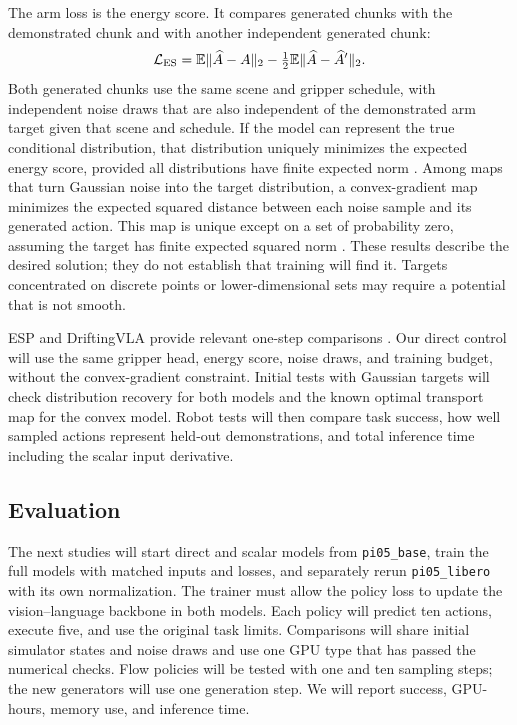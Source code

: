 The arm loss is the energy score. It compares generated chunks with the demonstrated chunk and with another independent generated chunk:
\begin{equation}
\mathcal L_{\rm ES}=\mathbb E\lVert\widehat A-A\rVert_2
-\tfrac12\mathbb E\lVert\widehat A-\widehat A'\rVert_2.
\end{equation}
Both generated chunks use the same scene and gripper schedule, with independent noise draws that are also independent of the demonstrated arm target given that scene and schedule. If the model can represent the true conditional distribution, that distribution uniquely minimizes the expected energy score, provided all distributions have finite expected norm \cite{gneitingraftery2007}. Among maps that turn Gaussian noise into the target distribution, a convex-gradient map minimizes the expected squared distance between each noise sample and its generated action. This map is unique except on a set of probability zero, assuming the target has finite expected squared norm \cite{brenier1991,mccann1995}. These results describe the desired solution; they do not establish that training will find it. Targets concentrated on discrete points or lower-dimensional sets may require a potential that is not smooth.

ESP and DriftingVLA provide relevant one-step comparisons \cite{esp,driftingvla}. Our direct control will use the same gripper head, energy score, noise draws, and training budget, without the convex-gradient constraint. Initial tests with Gaussian targets will check distribution recovery for both models and the known optimal transport map for the convex model. Robot tests will then compare task success, how well sampled actions represent held-out demonstrations, and total inference time including the scalar input derivative.

\subsection{Evaluation}
\label{sec:confirmation}
The next studies will start direct and scalar models from \texttt{pi05\_base}, train the full models with matched inputs and losses, and separately rerun \texttt{pi05\_libero} with its own normalization.
The trainer must allow the policy loss to update the vision--language backbone in both models. Each policy will predict ten actions, execute five, and use the original task limits. Comparisons will share initial simulator states and noise draws and use one GPU type that has passed the numerical checks. Flow policies will be tested with one and ten sampling steps; the new generators will use one generation step. We will report success, GPU-hours, memory use, and inference time.

